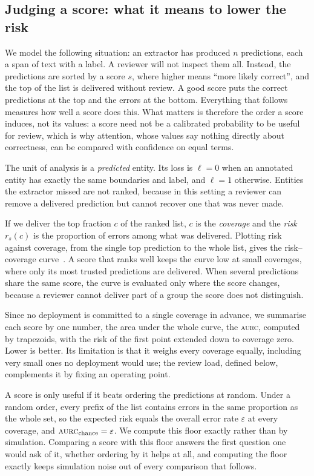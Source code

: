 \documentclass[11pt,a4paper]{article}
\newcommand{\aurc}{\textsc{aurc}}
\begin{document}
\subsection{Judging a score: what it means to lower the risk}
\label{sec:risk}

We model the following situation: an extractor has produced $n$ predictions, each a span of text with a label. A reviewer will not inspect them all. Instead, the predictions are sorted by a score $s$, where higher
means ``more likely correct'', and the top of the list is delivered without review. A good score puts the
correct predictions at the top and the errors at the bottom. Everything that follows measures how well a
score does this. What matters is therefore the order a score induces, not its values: a score need not be a calibrated probability to
be useful for review, which is why attention, whose values say nothing directly about correctness, can be compared with
confidence on equal terms.

The unit of analysis is a \emph{predicted} entity. Its loss is $\ell=0$ when an annotated
entity has exactly the same boundaries and label, and $\ell=1$ otherwise. Entities the extractor missed are not
ranked, because in this setting a reviewer can remove a delivered prediction but cannot recover one that was never
made.

If we deliver the top fraction $c$ of the ranked list, $c$ is the
\emph{coverage} and the \emph{risk} $r_s(c)$ is the proportion of errors among what was delivered. Plotting risk
against coverage, from the single top prediction to the whole list, gives the risk--coverage
curve~\citep{elyaniv2010foundations,geifman2017selective}. A score that ranks well keeps the curve low at small coverages, where only its
most trusted predictions are delivered. When several predictions share the same score, the curve is evaluated only
where the score changes, because a reviewer cannot deliver part of a group the score does not distinguish.

Since no deployment is committed to a single coverage in advance, we summarise each score by one number, the area under the whole curve, the \aurc{}, computed by trapezoids, with the risk of the first point extended
down to coverage zero. Lower is better. Its limitation is that it weighs every coverage equally, including very small ones no deployment
would use; the review load, defined below, complements it by fixing an operating point.

A score is only useful if it beats ordering the predictions at random.
Under a random order, every prefix of the list contains errors in the same proportion as the whole set, so the
expected risk equals the overall error rate $\varepsilon$ at every coverage, and $\aurc_{\text{chance}}=\varepsilon$.
We compute this floor exactly rather than by simulation. Comparing a score with this floor answers the first question one would ask of it,
whether ordering by it helps at all, and computing the floor exactly keeps simulation noise out of every comparison that follows.
\end{document}
